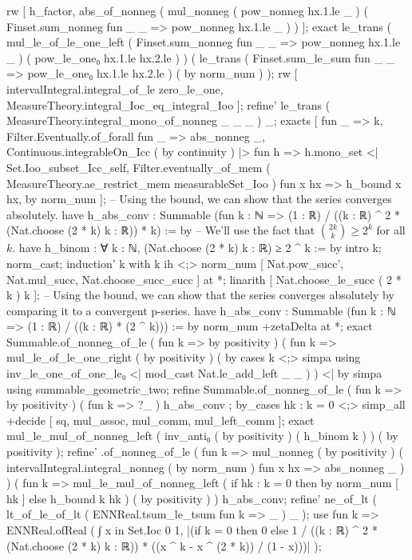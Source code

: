               rw [ h_factor, abs_of_nonneg ( mul_nonneg ( pow_nonneg hx.1.le _ ) ( Finset.sum_nonneg fun _ _ => pow_nonneg hx.1.le _ ) ) ];
              exact le_trans ( mul_le_of_le_one_left ( Finset.sum_nonneg fun _ _ => pow_nonneg hx.1.le _ ) ( pow_le_one₀ hx.1.le hx.2.le ) ) ( le_trans ( Finset.sum_le_sum fun _ _ => pow_le_one₀ hx.1.le hx.2.le ) ( by norm_num ) );
            rw [ intervalIntegral.integral_of_le zero_le_one, MeasureTheory.integral_Ioc_eq_integral_Ioo ];
            refine' le_trans ( MeasureTheory.integral_mono_of_nonneg _ _ _ ) _;
            exacts [ fun _ => k, Filter.Eventually.of_forall fun _ => abs_nonneg _, Continuous.integrableOn_Icc ( by continuity ) |> fun h => h.mono_set <| Set.Ioo_subset_Icc_self, Filter.eventually_of_mem ( MeasureTheory.ae_restrict_mem measurableSet_Ioo ) fun x hx => h_bound x hx, by norm_num ];
          -- Using the bound, we can show that the series converges absolutely.
          have h_abs_conv : Summable (fun k : ℕ => (1 : ℝ) / ((k : ℝ) ^ 2 * (Nat.choose (2 * k) k : ℝ)) * k) := by
            -- We'll use the fact that $\binom{2k}{k} \geq 2^k$ for all $k$.
            have h_binom : ∀ k : ℕ, (Nat.choose (2 * k) k : ℝ) ≥ 2 ^ k := by
              intro k; norm_cast; induction' k with k ih <;> norm_num [ Nat.pow_succ', Nat.mul_succ, Nat.choose_succ_succ ] at *;
              linarith [ Nat.choose_le_succ ( 2 * k ) k ];
            -- Using the bound, we can show that the series converges absolutely by comparing it to a convergent p-series.
            have h_abs_conv : Summable (fun k : ℕ => (1 : ℝ) / ((k : ℝ) * (2 ^ k))) := by
              norm_num +zetaDelta at *;
              exact Summable.of_nonneg_of_le ( fun k => by positivity ) ( fun k => mul_le_of_le_one_right ( by positivity ) ( by cases k <;> simpa using inv_le_one_of_one_le₀ <| mod_cast Nat.le_add_left _ _ ) ) <| by simpa using summable_geometric_two;
            refine Summable.of_nonneg_of_le ( fun k => by positivity ) ( fun k => ?_ ) h_abs_conv ; by_cases hk : k = 0 <;> simp_all +decide [ sq, mul_assoc, mul_comm, mul_left_comm ];
            exact mul_le_mul_of_nonneg_left ( inv_anti₀ ( by positivity ) ( h_binom k ) ) ( by positivity );
          refine' .of_nonneg_of_le ( fun k => mul_nonneg ( by positivity ) ( intervalIntegral.integral_nonneg ( by norm_num ) fun x hx => abs_nonneg _ ) ) ( fun k => mul_le_mul_of_nonneg_left ( if hk : k = 0 then by norm_num [ hk ] else h_bound k hk ) ( by positivity ) ) h_abs_conv;
        refine' ne_of_lt ( lt_of_le_of_lt ( ENNReal.tsum_le_tsum fun k => _ ) _ );
        use fun k => ENNReal.ofReal ( ∫ x in Set.Ioc 0 1, |(if k = 0 then 0 else 1 / ((k : ℝ) ^ 2 * (Nat.choose (2 * k) k : ℝ)) * ((x ^ k - x ^ (2 * k)) / (1 - x)))| );
